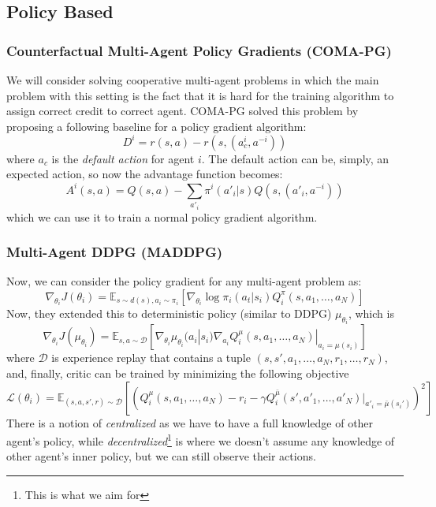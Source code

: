 \label{sec:chap2-deep-marl}

\subsection{Policy Based}

\subsubsection{Counterfactual Multi-Agent Policy Gradients (COMA-PG)}
We will consider solving cooperative multi-agent problems in which the main problem with this setting is the fact that it is hard for the training algorithm to assign correct credit to correct agent. COMA-PG \cite{foerster2018counterfactual} solved this problem by proposing a following baseline for a policy gradient algorithm:
\begin{equation}
    D^i = r(s, a) - r(s, (a_c^i, a^{-i}))
\end{equation}
where $a_c$ is the \textit{default action} for agent $i$. The default action can be, simply, an expected action, so now the advantage function becomes:
\begin{equation}
    A^i(s, a) = Q(s, a) - \sum_{a'_i} \pi^i(a'_i | s) Q(s, (a'_i,a^{-i}))
\end{equation}
which we can use it to train a normal policy gradient algorithm.

\subsubsection{Multi-Agent DDPG (MADDPG) \cite{lowe2017multi}}
Now, we can consider the policy gradient for any multi-agent problem as:
\begin{equation}
\nabla_{\theta_i}J(\theta_i) = \mathbb{E}_{s\sim d(s), a_i \sim \pi_i} \left[ \nabla_{\theta_i} \log \pi_i(a_t | s_i) Q^{\pi}_i(s, a_1, \dots, a_N) \right]
\end{equation}
Now, they extended this to deterministic policy (similar to DDPG) $\mu_{\theta_i}$, which is 
\begin{equation}
    \nabla_{\theta_i}J(\mu_{\theta_i}) = \mathbb{E}_{s, a \sim \mathcal{D}} \left[ \nabla_{\theta_i} \mu_{\theta_i}(a_i | s_i) \nabla_{a_i} Q^{\mu}_i(s, a_1, \dots, a_N) |_{a_i = \mu(s_i)} \right]
\end{equation}
where $\mathcal{D}$ is experience replay that contains a tuple $(s, s', a_1, \dots, a_N, r_1, \dots, r_N)$, and, finally, critic can be trained by minimizing the following objective 
\begin{equation}
    \mathcal{L}(\theta_i) = \mathbb{E}_{(s, a, s', r) \sim \mathcal{D}}\left[ \left( Q^{\mu}_i (s, a_1, \dots, a_N) - r_i - \gamma Q^{\bar{\mu}}_i(s', a'_1, \dots, a'_N) |_{a'_i = \bar{\mu}(s_i')} \right)^2  \right]
\end{equation}
There is a notion of \textit{centralized} as we have to have a full knowledge of other agent's policy, while \textit{decentralized}\footnote{This is what we aim for} is where we doesn't assume any knowledge of other agent's inner policy, but we can still observe their actions. 

